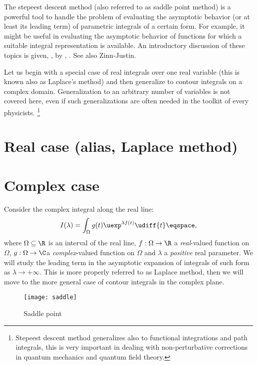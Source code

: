 


The 
stepeest descent method (also referred to as saddle point method) is a powerful tool to handle the problem of
evaluating  the
  asymptotic behavior (or at least its leading term) of parametric integrals of a certain form.
For example, it might be useful in evaluating the asymptotic behavior of functions
 for which a suitable integral representation is available.
An introductory discussion of these topics is given, \eg, by
\citet[\S~11]{king}, \citet[\S6]{ablowitz}. See also Zinn-Justin.
\par
Let us begin with a special case of real integrals over one real variable (this
is known also as Laplace's method) and then generalize to contour integrals on
a  complex domain. Generalization to an arbitrary number of variables is not
covered here, even if such generalizations are often needed in the toolkit of
every physicists.%
\footnote{Stepeest  descent method  generalizes also to
functional
integrations and path integrals, this is very important in dealing with
non-perturbative corrections in quantum mechanics and quantum field
theory.}
\section{Real case (alias, Laplace method)}
\section{Complex case}
Consider the complex integral  along the real line:
\begin{equation}
I(\lambda) = \int_{\Omega}  g(t)  \uexp^{ \lambda f(t)} \udiff{t} \eqspace, 
\end{equation}
where $\Omega\subseteq \R$ is an interval of the real line,
$f:\Omega\rightarrow\R$ a \emph{real}-valued function on $\Omega$,
$g:\Omega\rightarrow\C$a  \emph{complex}-valued function on $\Omega$ and
$\lambda$ a \emph{positive} real parameter.
We will study the leading term in the asymptotic expansion of integrals of such
form as $\lambda \rightarrow+\infty$. This is more properly referred to as
Laplace method, then we will move to the more general case of contour integrals
in the complex plane.
\par
\begin{figure}
\texttt{[image: saddle]}
\caption{Saddle point}
\end{figure}




